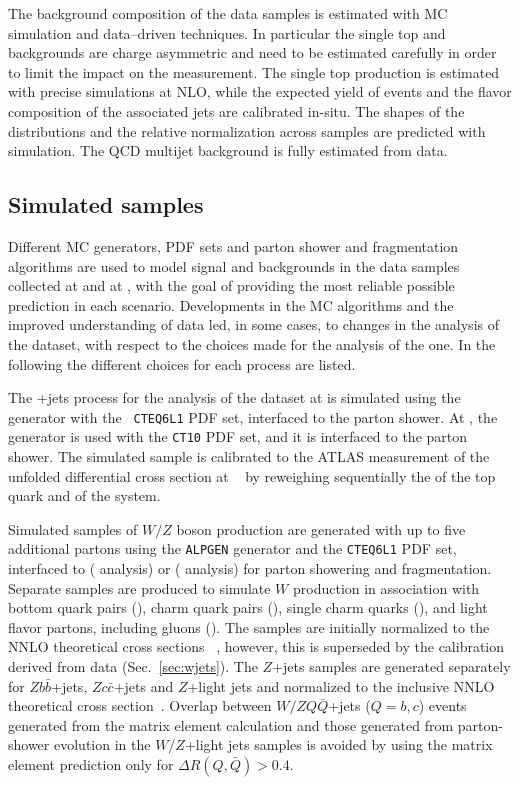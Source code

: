 The background composition of the data samples is estimated with MC
simulation and data--driven techniques. In particular the single top 
and \wjets{} backgrounds are charge asymmetric and need to be estimated
carefully in order to limit the impact on the measurement. The single top
production is estimated with precise simulations at NLO, while the
expected yield of \wjets{} events and the flavor composition of the
associated jets are calibrated in-situ. The shapes of the
distributions and the relative normalization across samples are
predicted with simulation.
The QCD multijet background is fully estimated from data.

\subsection{Simulated samples}
\label{sec:mcsamples}

Different MC generators, PDF sets and parton shower and fragmentation
algorithms are used to model signal and backgrounds in the data
samples collected at \seventev{} and at \eighttev{}, with the goal of
providing the most reliable possible prediction in each scenario.
Developments in the MC algorithms and the improved understanding of
data led, in some cases, to changes in the analysis of the \eighttev{}
dataset, with respect to the choices made for the analysis of the
\seventev{} one. 
In the following the different choices for each process are listed.

The \ttbar{}+jets process for the analysis of the dataset at
\seventev{} is simulated using the \alpgen{} generator with the {\tt
  CTEQ6L1} PDF set, interfaced to the \herwig{} parton shower.  
At \eighttev{}, the \powheg{} generator is used with the {\tt CT10}
PDF set, and it is interfaced to the \pythia{} parton shower. 
The simulated sample is calibrated to the ATLAS measurement of the
unfolded differential cross section at \seventev{}~\cite{Aad:2014zka}
by reweighing sequentially the \pt{} of the top quark and of the
\ttbar{} system.

Simulated samples of $W/Z$ boson production are generated with up to
five additional partons using the {\tt ALPGEN} generator and the
{\tt CTEQ6L1} PDF set, interfaced to \herwig{} (\seventev{} analysis) or
\pythia{} (\eighttev{} analysis) for parton showering and fragmentation. 
Separate samples are produced to simulate $W$ production in
association with bottom quark pairs (\wbb{}), charm quark
pairs (\wcc{}), single charm quarks (\wc{}), and light
flavor partons, including gluons (\wlight{}). The samples are initially
normalized to the NNLO theoretical cross sections ~\cite{vjetsxs},
however, this is superseded by the calibration derived from data
(Sec.~\ref{sec:wjets}).
The $Z$+jets samples are generated separately for $Zb\bar{b}$+jets,
$Zc\bar{c}$+jets and $Z$+light jets and normalized to the inclusive
NNLO theoretical cross section~\cite{vjetsxs}.
Overlap between $W/ZQ\bar{Q}$+jets ($Q=b,c$) events generated from the
matrix element calculation and those generated from parton-shower
evolution in the $W/Z$+light jets samples is avoided by using the
matrix element prediction only for $\Delta R(Q,\bar{Q})>0.4$.

